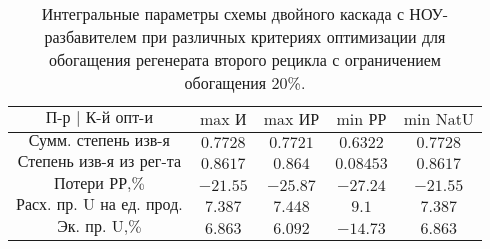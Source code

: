 \begin{table}
    \begin{tabular}{ccccc}
        $\text{П-р | К-й опт-и}$ & $\text{max И}$ & $\text{max ИР}$ & $\text{min РР}$ & $\text{min NatU}$\\ \hline
        $\text{Сумм. степень изв-я}$ & $0.7728$ & $0.7721$ & $0.6322$ & $0.7728$\\ \hline
        $\text{Степень изв-я из рег-та}$ & $0.8617$ & $0.864$ & $0.08453$ & $0.8617$\\ \hline
        $\text{Потери РР,\%}$ & $-21.55$ & $-25.87$ & $-27.24$ & $-21.55$\\ \hline
        $\text{Расх. пр. U на ед. прод.}$ & $7.387$ & $7.448$ & $9.1$ & $7.387$\\ \hline
        $\text{Эк. пр. U,\%}$ & $6.863$ & $6.092$ & $-14.73$ & $6.863$
    \end{tabular}
    \caption{Интегральные параметры схемы двойного каскада с НОУ-разбавителем при различных критериях оптимизации для обогащения регенерата второго рецикла с ограничением обогащения 20\%.{\label{2opt2_20_int}}}
\end{table}

